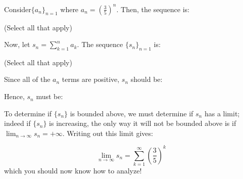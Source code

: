 \documentclass{ximera}
\author{Jim Talamo}
\begin{document}
\begin{exercise}
Consider$\{a_n \}_{n=1}$ where $a_n = \left(\frac{3}{5}\right)^n$.  Then, the sequence is:

\begin{selectAll}
\end{selectAll}
(Select all that apply)

Now, let $s_n = \sum_{k=1}^{n} a_k$.  The sequence $\{s_n \}_{n=1}$ is:
\begin{selectAll}
\end{selectAll}
(Select all that apply)

\begin{hint}
Since all of the $a_n$ terms are positive, $s_n$ should be:

\begin{multipleChoice}
\end{multipleChoice}

Hence, $s_n$ must be:
\begin{multipleChoice}
\end{multipleChoice}

To determine if $\{s_n\}$ is bounded above, we must determine if $s_n$ has a limit; indeed if $\{s_n\}$ is increasing, the only way it will not be bounded above is if $\lim_{n \to \infty} s_n = +\infty$.  Writing out this limit gives:

\[
\lim_{n \to \infty} s_n = \sum_{k=1}^{\infty}  \left(\frac{3}{5}\right)^k
\]
which you should now know how to analyze!
\end{hint}
\end{exercise}
\end{document}
